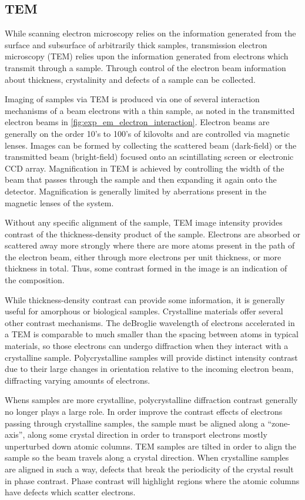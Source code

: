 \subsection{TEM}
While scanning electron microscopy relies on the information generated from the surface and subsurface of arbitrarily thick samples, transmission electron microscopy (TEM) relies upon the information generated from electrons which transmit through a sample. Through control of the electron beam information about thickness, crystalinity and defects of a sample can be collected.

Imaging of samples via TEM is produced via one of several interaction mechanisms of a beam electrons with a thin sample, as noted in the transmitted electron beams in \cref{fig:exp_em_electron_interaction}. Electron beams are generally on the order 10's to 100's of kilovolts and are controlled via magnetic lenses. Images can be formed by collecting the scattered beam (dark-field) or the transmitted beam (bright-field) focused onto an scintillating screen or electronic CCD array. Magnification in TEM is achieved by controlling the width of the beam that passes through the sample and then expanding it again onto the detector. Magnification is generally limited by aberrations present in the magnetic lenses of the system.

Without any specific alignment of the sample, TEM image intensity provides contrast of the thickness-density product of the sample. Electrons are absorbed or scattered away more strongly where there are more atoms present in the path of the electron beam, either through more electrons per unit thickness, or more thickness in total. Thus, some contrast formed in the image is an indication of the composition.

While thickness-density contrast can provide some information, it is generally useful for amorphous or biological samples. Crystalline materials offer several other contrast mechanisms. The deBroglie wavelength of electrons accelerated in a TEM is comparable to much smaller than the spacing between atoms in typical materials, so those electrons can undergo diffraction when they interact with a crystalline sample. Polycrystalline samples will provide distinct intensity contrast due to their large changes in orientation relative to the incoming electron beam, diffracting varying amounts of electrons.

Whens samples are more crystalline, polycrystalline diffraction contrast generally no longer plays a large role. In order improve the contrast effects of electrons passing through crystalline samples, the sample must be aligned along a ``zone-axis'', along some crystal direction in order to transport electrons mostly unperturbed down atomic columns. TEM samples are tilted in order to align the sample so the beam travels along a crystal direction. When crystalline samples are aligned in such a way, defects that break the periodicity of the crystal result in phase contrast. Phase contrast will highlight regions where the atomic columns have defects which scatter electrons.

